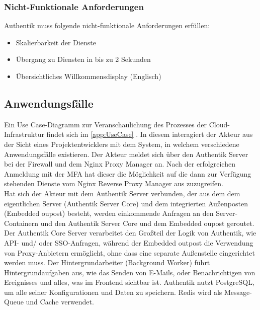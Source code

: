 \subsubsection{Nicht-Funktionale Anforderungen}
\label{sec:Nicht-Funktional}
Authentik muss folgende nicht-funktionale Anforderungen erfüllen:
\begin{itemize} [label=--]
	\item Skalierbarkeit der Dienste
	\item Übergang zu Diensten in bis zu 2 Sekunden
	\item Übersichtliches Willkommensdisplay (Englisch)
\end{itemize}


\subsection{Anwendungsfälle}
\label{sec:Anwendungsfaelle}
Ein Use Case-Diagramm zur Veranschaulichung des Prozesses der Cloud-Infrastruktur findet sich im  \ref{app:UseCase} .
In diesem interagiert der Akteur aus der Sicht eines Projektentwicklers mit dem System, in welchem verschiedene 
Anwendungsfälle existieren. Der Akteur meldet sich über den Authentik Server bei der Firewall und dem Nginx Proxy Manager an. 
Nach der erfolgreichen Anmeldung mit der \acs{MFA} hat dieser die Möglichkeit auf die dann zur Verfügung stehenden Dienste vom 
Nginx Reverse Proxy Manager aus zuzugreifen.
\\Hat sich der Akteur mit dem Authentik Server verbunden, der aus dem dem eigentlichen Server (Authentik Server Core) und dem 
integrierten Außenposten (Embedded oupost) besteht, werden einkommende Anfragen an den Server-Containern und den Authentik Server Core 
und dem Embedded oupost geroutet. Der Authentik Core Server verarbeitet den Großteil der Logik von Authentik, wie \zB \acs{API}- und/ oder 
\acs{SSO}-Anfragen, während der Embedded outpost die Verwendung von Proxy-Anbietern ermöglicht, ohne dass eine separate Außenstelle 
eingerichtet werden muss. Der Hintergrundarbeiter (Background Worker) führt Hintergrundaufgaben aus, wie das Senden von E-Mails, 
oder Benachrichtigen von Ereignisses und alles, was im Frontend sichtbar ist. Authentik nutzt PostgreSQL, um alle seiner 
Konfigurationen und Daten zu speichern. Redis wird als Message-Queue und Cache verwendet.